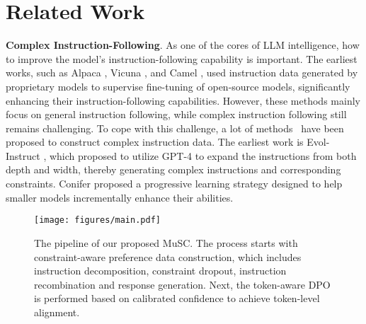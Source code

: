 \section{Related Work}
\noindent\textbf{Complex Instruction-Following}.
As one of the cores of LLM intelligence, how to improve the model's instruction-following capability is important. The earliest works, such as Alpaca \cite{alpaca}, Vicuna \cite{vicuna2023}, and Camel \cite{camel2023}, used instruction data generated by proprietary models to supervise fine-tuning of open-source models, 
significantly enhancing their instruction-following capabilities. However, these methods mainly focus on general instruction following, while complex instruction following still remains challenging.
To cope with this challenge, a lot of methods~\cite{yin2023dynosaur,lou2023muffin,he2024complexsimpleenhancingmulticonstraint,sun2024parrot,chen2024dog,dong2024self} have been proposed to construct complex instruction data. 
The earliest work is Evol-Instruct \cite{xu2024wizardlm}, which proposed to utilize GPT-4 to expand the instructions from both depth and width, thereby generating complex instructions and corresponding constraints. 
Conifer \cite{sun2024conifer} proposed a progressive learning strategy designed to help smaller models incrementally enhance their abilities.

\begin{figure*}[t]
    \centering
    \texttt{[image: figures/main.pdf]}
    \caption{The pipeline of our proposed MuSC. The process starts with constraint-aware preference data construction, which includes instruction decomposition, constraint dropout, instruction recombination and response generation. Next, the token-aware DPO is performed based on calibrated confidence to achieve token-level alignment.}
    \label{fig: intro-2}
    \vspace{-1mm}
\end{figure*}

